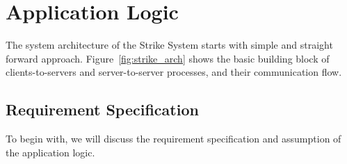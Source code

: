 \documentclass[dareport.tex]{subfiles}
\begin{document}
\section{Application Logic}
The system architecture of the Strike System starts with simple and straight forward approach. Figure~\ref{fig:strike_arch} shows the basic building block of clients-to-servers and server-to-server processes, and their communication flow.


\subsection{Requirement Specification}
To begin with, we will discuss the requirement specification and assumption of the application logic. 
\end{document}
